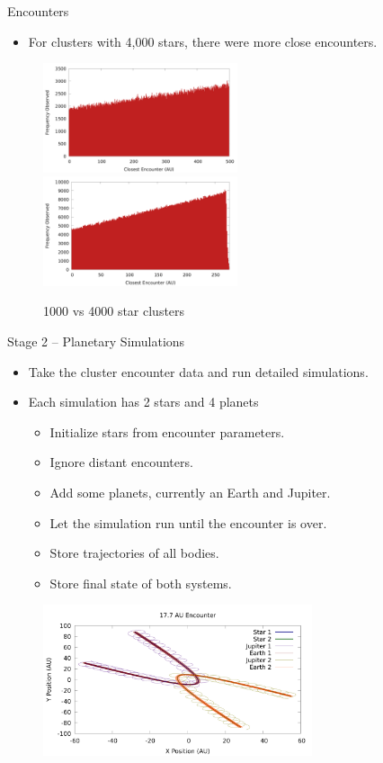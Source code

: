 \documentclass{beamer}
\begin{document}
\begin{frame}{Encounters}
    \begin{itemize}
        \item For clusters with 4,000 stars, there were more close encounters.
    \end{itemize}
    \begin{figure}
        \centering
        \caption{1000 vs 4000 star clusters}
        \includegraphics[width=2.25in]{encounter_distance_frequency_n1000} \\
        \includegraphics[width=2.25in]{encounter_distance_frequency_n4000}
    \end{figure}
\end{frame}

\begin{frame}{Stage 2 -- Planetary Simulations}
    \begin{itemize}
        \item Take the cluster encounter data and run detailed simulations.
        \item Each simulation has 2 stars and 4 planets
        \begin{itemize}
            \item Initialize stars from encounter parameters.
            \item Ignore distant encounters.
            \item Add some planets, currently an Earth and Jupiter.
            \item Let the simulation run until the encounter is over.
            \item Store trajectories of all bodies.
            \item Store final state of both systems.
        \end{itemize}
    \end{itemize}
    \begin{figure}
        \centering
        \includegraphics[height=1.75in]{17_7_AU}
    \end{figure}
\end{frame}
\end{document}
